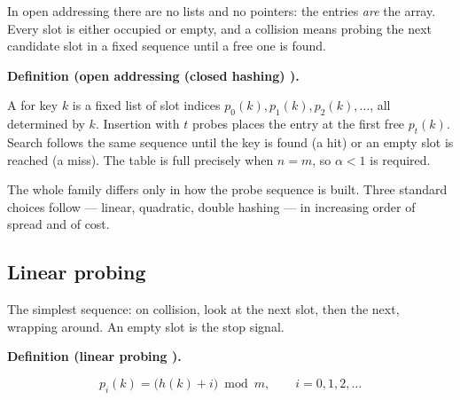 \documentclass[11pt]{article}
\newenvironment{definitionbox}[1]{%
  \par\noindent\textbf{Definition (#1).}\ \itshape
}{\par\vspace{0.3em}}
\begin{document}
In open addressing there are no lists and no pointers: the entries \emph{are} the array. Every slot is either occupied or empty, and a collision means probing the next candidate slot in a fixed sequence until a free one is found.

\begin{definitionbox}{open addressing (closed hashing) \cite{Wirth2004_algorithms_data_structures,Sedgewick2011_algorithms}}
A  for key $k$ is a fixed list of slot indices $p_0(k), p_1(k), p_2(k), \dots$, all determined by $k$. Insertion with $t$ probes places the entry at the first free $p_t(k)$. Search follows the same sequence until the key is found (a hit) or an empty slot is reached (a miss). The table is full precisely when $n = m$, so $\alpha < 1$ is required.
\end{definitionbox}

The whole family differs only in how the probe sequence is built. Three standard choices follow --- linear, quadratic, double hashing --- in increasing order of spread and of cost.

\subsection{Linear probing}

The simplest sequence: on collision, look at the next slot, then the next, wrapping around. An empty slot is the stop signal.

\begin{definitionbox}{linear probing \cite{Wirth2004_algorithms_data_structures}}
\[ p_i(k) = \big(h(k) + i\big) \bmod m, \qquad i = 0, 1, 2, \dots \]
\end{definitionbox}
\end{document}

